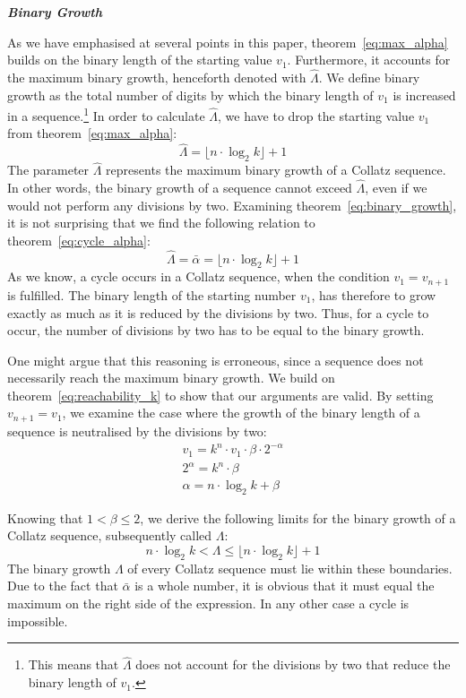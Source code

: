\documentclass{SciPress_2015}
\renewcommand{\subsection}[1]{\textit{\textbf{#1}}}
\begin{document}
\subsection{Binary Growth}
\par\noindent
As we have emphasised at several points in this paper, theorem~\ref{eq:max_alpha} builds on the binary length of the starting value $v_1$. Furthermore, it accounts for the maximum binary growth, henceforth denoted with $\hat\Lambda$. We define binary growth as the total number of digits by which the binary length of $v_1$ is increased in a sequence.\footnote{This means that $\hat\Lambda$ does not account for the divisions by two that reduce the binary length of $v_1$.} In order to calculate $\hat\Lambda$, we have to drop the starting value $v_1$ from theorem~\ref{eq:max_alpha}:
\begin{equation}
\label{eq:binary_growth}
\hat\Lambda=\lfloor n\cdot\log_2k\rfloor+1
\end{equation}
The parameter $\hat\Lambda$ represents the maximum binary growth of a Collatz sequence. In other words, the binary growth of a sequence cannot exceed $\hat\Lambda$, even if we would not perform any divisions by two. Examining theorem~\ref{eq:binary_growth}, it is not surprising that we find the following relation to theorem~\ref{eq:cycle_alpha}:
\[
\hat\Lambda=\bar\alpha=\lfloor n\cdot\log_2k\rfloor+1
\]
As we know, a cycle occurs in a Collatz sequence, when the condition $v_1=v_{n+1}$ is fulfilled. The binary length of the starting number $v_1$, has therefore to grow exactly as much as it is reduced by the divisions by two. Thus, for a cycle to occur, the number of divisions by two has to be equal to the binary growth.

\par\medskip
One might argue that this reasoning is erroneous, since a sequence does not necessarily reach the maximum binary growth. We build on theorem~\ref{eq:reachability_k} to show that our arguments are valid. By setting $v_{n+1}=v_1$, we examine the case where the growth of the binary length of a sequence is neutralised by the divisions by two:
\[
\begin{array}{c}
v_1=k^n\cdot v_1\cdot\beta\cdot2^{-\alpha}\\
2^{\alpha}=k^n\cdot\beta\\
\alpha=n\cdot\log_2k+\beta
\end{array}
\]

\par\noindent
Knowing that $1<\beta\le2$, we derive the following limits for the binary growth of a Collatz sequence, subsequently called $\Lambda$:
\[
n\cdot\log_2k<\Lambda\le\lfloor n\cdot\log_2k\rfloor+1
\]
The binary growth $\Lambda$ of every Collatz sequence must lie within these boundaries. Due to the fact that $\bar\alpha$ is a whole number, it is obvious that it must equal the maximum on the right side of the expression. In any other case a cycle is impossible.
\end{document}
